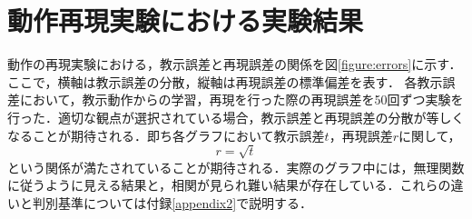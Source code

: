 \clearpage
\chapter{動作再現実験における実験結果}\label{appendix1}

動作の再現実験における，教示誤差と再現誤差の関係を図\ref{figure:errors}に示す．
ここで，横軸は教示誤差の分散，縦軸は再現誤差の標準偏差を表す．
各教示誤差において，教示動作からの学習，再現を行った際の再現誤差を50回ずつ実験を行った．適切な観点が選択されている場合，教示誤差と再現誤差の分散が等しくなることが期待される．即ち各グラフにおいて教示誤差$t$，再現誤差$r$に関して，
\[
	r = \sqrt{t}
\]
という関係が満たされていることが期待される．実際のグラフ中には，無理関数に従うように見える結果と，相関が見られ難い結果が存在している．これらの違いと判別基準については付録\ref{appendix2}で説明する．

